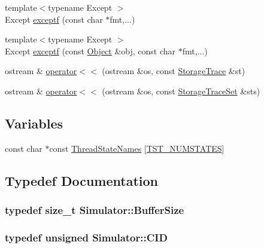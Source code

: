 \begin{DoxyCompactItemize}
\item 
{\footnotesize template$<$typename Except $>$ }\\Except \hyperlink{namespace_simulator_a494c06a00208aa1461fed8e770ae3b32}{exceptf} (const char $\ast$fmt,...)
\item 
{\footnotesize template$<$typename Except $>$ }\\Except \hyperlink{namespace_simulator_a5f6d9005d615c0c88a0e042c875abb81}{exceptf} (const \hyperlink{class_simulator_1_1_object}{Object} \&obj, const char $\ast$fmt,...)
\item 
ostream \& \hyperlink{namespace_simulator_aa3939362cd8e2c507353ed096a474020}{operator$<$$<$} (ostream \&os, const \hyperlink{class_simulator_1_1_storage_trace}{Storage\+Trace} \&st)
\item 
ostream \& \hyperlink{namespace_simulator_a0a21c9925b1a12077f1297ef9ff7058b}{operator$<$$<$} (ostream \&os, const \hyperlink{class_simulator_1_1_storage_trace_set}{Storage\+Trace\+Set} \&sts)
\end{DoxyCompactItemize}
\subsection*{Variables}
\begin{DoxyCompactItemize}
\item 
const char $\ast$const \hyperlink{namespace_simulator_ac83869ddbe91d60b829877113e17acb0}{Thread\+State\+Names} \mbox{[}\hyperlink{namespace_simulator_a5450f6fb4b10ec16b290049311b8d5d0a78a2fff5d83cad45629b181024323bdf}{T\+S\+T\+\_\+\+N\+U\+M\+S\+T\+A\+T\+E\+S}\mbox{]}
\end{DoxyCompactItemize}


\subsection{Typedef Documentation}
\hypertarget{namespace_simulator_a5ca279f926485be2d0554e41275a3305}{
\subsubsection[{Buffer\+Size}]{\setlength{\rightskip}{0pt plus 5cm}typedef size\+\_\+t {\bf Simulator\+::\+Buffer\+Size}}}\label{namespace_simulator_a5ca279f926485be2d0554e41275a3305}
\hypertarget{namespace_simulator_a97f45fafcb1aafc0f269a19608b39d60}{
\subsubsection[{C\+I\+D}]{\setlength{\rightskip}{0pt plus 5cm}typedef unsigned {\bf Simulator\+::\+C\+I\+D}}}\label{namespace_simulator_a97f45fafcb1aafc0f269a19608b39d60}


